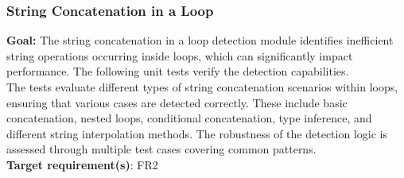 \documentclass[12pt, titlepage]{article}
\begin{document}
  \subsubsection{String Concatenation in a Loop}

  \textbf{Goal:} The string concatenation in a loop detection module
  identifies inefficient string operations occurring inside loops,
  which can significantly impact performance. The following unit
  tests verify the detection capabilities.\\

  \noindent The tests evaluate different types of string
  concatenation scenarios within loops, ensuring that various cases
  are detected correctly. These include basic concatenation, nested
  loops, conditional concatenation, type inference, and different
  string interpolation methods. The robustness of the detection logic
  is assessed through multiple test cases covering common patterns.\\

  \noindent\textbf{Target requirement(s)}: FR2~\cite{SRS} \\
\end{document}
